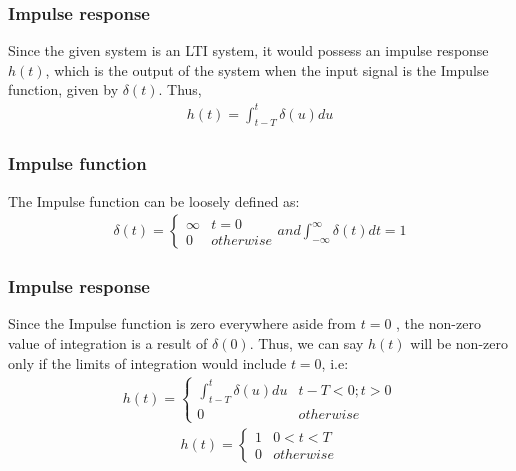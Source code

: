 \documentclass{beamer}
\begin{document}
\begin{frame}
    \frametitle{Impulse response}
    \begin{flushleft}
    Since the given system is an LTI system, it would possess an impulse response $h(t)$, which is the output of the system when the input signal is the Impulse function, given by $\delta(t)$. Thus,
\begin{align}
    h(t) = \int_{t-T}^{t} \delta(u)du
\end{align}
    \end{flushleft}
\end{frame}
\begin{frame}
    \frametitle{Impulse function}
    \begin{flushleft}
    The Impulse function can be loosely defined as:
\begin{align}
    \delta(t) = 
    \begin{cases}
\infty & t = 0\\
0 & otherwise
\end{cases}
and \int_{-\infty}^\infty \delta(t)dt  = 1
\end{align}
    \end{flushleft}
\end{frame}
\begin{frame}
    \frametitle {Impulse response}
    \begin{flushleft}
    Since the Impulse function is zero everywhere aside from $t = 0$ , the non-zero value of integration is a result of $\delta(0)$. Thus, we can say $h(t)$ will be non-zero only if the limits of integration would include $t=0$, i.e:
\begin{align}
    h(t) = 
    \begin{cases}
    \int_{t-T}^{t} \delta(u)du & t-T<0 ; t>0\\
    0 & otherwise
    \end{cases}
    \end{align}
    \begin{align}
h(t) = 
    \begin{cases}
    1 & 0<t<T\\
    0 & otherwise
    \end{cases}
    \label{H}
\end{align}
    \end{flushleft}
\end{frame}
\end{document}
